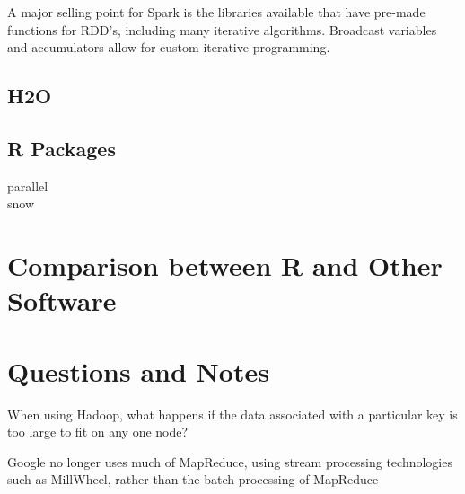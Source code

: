 \documentclass[10pt,a4paper]{article}
\begin{document}
A major selling point for Spark is the libraries available that have
pre-made functions for RDD's, including many iterative algorithms.
Broadcast variables and accumulators allow for custom iterative
programming.

\subsection{H2O}
\label{sec:h2o}



\subsection{R Packages}
\label{sec:r-packages}

\begin{description}
\item[parallel] 
\item[snow] 
\end{description}

\section{Comparison between R and Other Software}
\label{sec:comparison-between-r}

\section{Questions and Notes}
\label{sec:questions}

When using Hadoop, what happens if the data associated with a
particular key is too large to fit on any one node?

Google no longer uses much of MapReduce, using stream processing
technologies such as MillWheel, rather than the batch processing of
MapReduce

\nocite{zaharia2010spark}
\nocite{shvachko2010hadoop}
\nocite{dean2004mapreduce}
\nocite{ghemawat2003google}
\printbibliography{}
\end{document}
